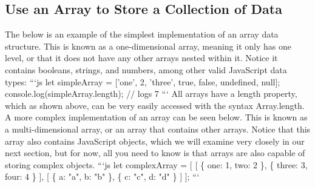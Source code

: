 \documentclass{article}%
\begin{document}
\subsection{Use an Array to Store a Collection of Data}%
\label{subsec:UseanArraytoStoreaCollectionofData}%
The below is an example of the simplest implementation of an array data structure. This is known as a one{-}dimensional array, meaning it only has one level, or that it does not have any other arrays nested within it. Notice it contains booleans, strings, and numbers, among other valid JavaScript data types:\newline%
```js\newline%
let simpleArray = {[}'one', 2, 'three', true, false, undefined, null{]};\newline%
console.log(simpleArray.length);\newline%
// logs 7\newline%
```\newline%
All arrays have a length property, which as shown above, can be very easily accessed with the syntax Array.length.\newline%
A more complex implementation of an array can be seen below. This is known as a multi{-}dimensional array, or an array that contains other arrays. Notice that this array also contains JavaScript objects, which we will examine very closely in our next section, but for now, all you need to know is that arrays are also capable of storing complex objects.\newline%
```js\newline%
let complexArray = {[}\newline%
  {[}\newline%
    \{\newline%
      one: 1,\newline%
      two: 2\newline%
    \},\newline%
    \{\newline%
      three: 3,\newline%
      four: 4\newline%
    \}\newline%
  {]},\newline%
  {[}\newline%
    \{\newline%
      a: "a",\newline%
      b: "b"\newline%
    \},\newline%
    \{\newline%
      c: "c",\newline%
      d: "d"\newline%
    \}\newline%
  {]}\newline%
{]};\newline%
```\newline%
\end{document}
